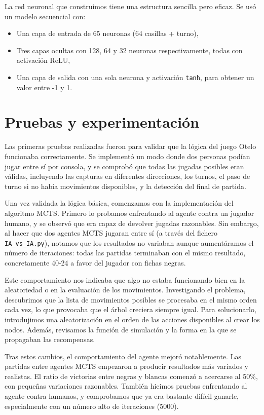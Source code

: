 \documentclass[conference]{IEEEtran}
\begin{document}
La red neuronal que construimos tiene una estructura sencilla pero eficaz. Se usó un modelo secuencial con:
\begin{itemize}
    \item Una capa de entrada de 65 neuronas (64 casillas + turno),
    \item Tres capas ocultas con 128, 64 y 32 neuronas respectivamente, todas con activación ReLU,
    \item Una capa de salida con una sola neurona y activación \texttt{tanh}, para obtener un valor entre -1 y 1.
\end{itemize}

\section{Pruebas y experimentación}
Las primeras pruebas realizadas fueron para validar que la lógica del juego Otelo funcionaba correctamente. Se implementó un modo donde dos personas podían jugar entre sí por consola, y se comprobó que todas las jugadas posibles eran válidas, incluyendo las capturas en diferentes direcciones, los turnos, el paso de turno si no había movimientos disponibles, y la detección del final de partida.

Una vez validada la lógica básica, comenzamos con la implementación del algoritmo MCTS. Primero lo probamos enfrentando al agente contra un jugador humano, y se observó que era capaz de devolver jugadas razonables. Sin embargo, al hacer que dos agentes MCTS jugaran entre sí (a través del fichero \texttt{IA\_vs\_IA.py}), notamos que los resultados no variaban aunque aumentáramos el número de iteraciones: todas las partidas terminaban con el mismo resultado, concretamente 40-24 a favor del jugador con fichas negras.

Este comportamiento nos indicaba que algo no estaba funcionando bien en la aleatoriedad o en la evaluación de los movimientos. Investigando el problema, descubrimos que la lista de movimientos posibles se procesaba en el mismo orden cada vez, lo que provocaba que el árbol creciera siempre igual. Para solucionarlo, introdujimos una aleatorización en el orden de las acciones disponibles al crear los nodos. Además, revisamos la función de simulación y la forma en la que se propagaban las recompensas.

Tras estos cambios, el comportamiento del agente mejoró notablemente. Las partidas entre agentes MCTS empezaron a producir resultados más variados y realistas. El ratio de victorias entre negras y blancas comenzó a acercarse al 50\%, con pequeñas variaciones razonables. También hicimos pruebas enfrentando al agente contra humanos, y comprobamos que ya era bastante difícil ganarle, especialmente con un número alto de iteraciones (5000).
\end{document}
